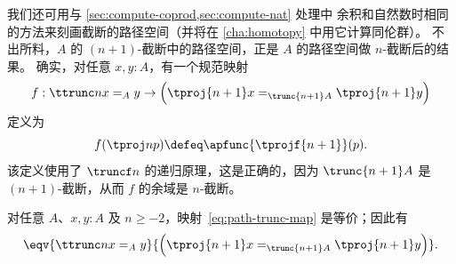 我们还可用与 \cref{sec:compute-coprod,sec:compute-nat} 处理中
余积和自然数时相同的方法来刻画截断的路径空间（并将在 \cref{cha:homotopy} 中用它计算同伦群）。
不出所料，$A$ 的 $(n+1)$-截断中的路径空间，正是 $A$ 的路径空间做 $n$-截断后的结果。
确实，对任意 $x,y:A$，有一个规范映射
\begin{equation}
  f:\ttrunc n{x=_Ay}\to \Big(\tproj {n+1}x=_{\trunc{n+1}A}\tproj {n+1}y\Big)\label{eq:path-trunc-map}
\end{equation}
定义为
\[f(\tproj n{p})\defeq \apfunc{\tprojf {n+1}}(p). \]
该定义使用了 $\truncf n$ 的递归原理，这是正确的，因为 $\trunc {n+1}A$ 是 $(n+1)$-截断，从而
$f$ 的余域是 $n$-截断。

\begin{thm} \label{thm:path-truncation}
  对任意 $A$、$x,y:A$ 及 $n\ge -2$，映射~\eqref{eq:path-trunc-map} 是等价；因此有
  \[ \eqv{\ttrunc n{x=_Ay}}{\Big(\tproj {n+1}x=_{\trunc{n+1}A}\tproj {n+1}y\Big)}. \]
\end{thm}

